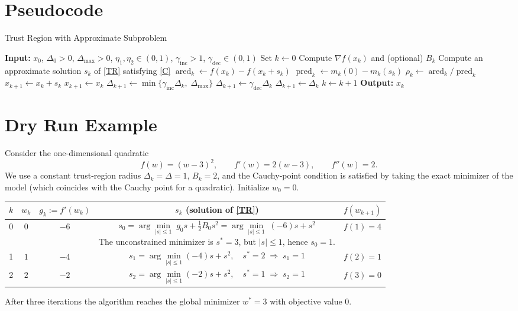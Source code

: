 \documentclass{article}
\begin{document}
\section*{Pseudocode}
\begin{algorithm}[H]
\caption{Trust Region with Approximate Subproblem}
\begin{algorithmic}[1]
\State \textbf{Input:} $x_0$, $\Delta_0>0$, $\Delta_{\max}>0$, $\eta_1,\eta_2\in(0,1)$,
$\gamma_{\text{inc}}>1$, $\gamma_{\text{dec}}\in(0,1)$
\State Set $k\gets0$
    \State Compute $\nabla f(x_k)$ and (optional) $B_k$
    \State Compute an approximate solution $s_k$ of \eqref{TR} satisfying \eqref{C}
    \State $\operatorname{ared}_k\gets f(x_k)-f(x_k+s_k)$
    \State $\operatorname{pred}_k\gets m_k(0)-m_k(s_k)$
    \State $\rho_k\gets \operatorname{ared}_k/\operatorname{pred}_k$ 
        \State $x_{k+1}\gets x_k+s_k$ 
    \Else
        \State $x_{k+1}\gets x_k$ 
    \EndIf
        \State $\Delta_{k+1}\gets \min\{\gamma_{\text{inc}}\Delta_k,\;\Delta_{\max}\}$
        \State $\Delta_{k+1}\gets \gamma_{\text{dec}}\Delta_k$
    \Else
        \State $\Delta_{k+1}\gets \Delta_k$
    \EndIf
    \State $k\gets k+1$
\EndWhile
\State \textbf{Output:} $x_k$
\end{algorithmic}
\end{algorithm}

\section*{Dry Run Example}
Consider the one‑dimensional quadratic
\[
f(w)=(w-3)^2,\qquad f'(w)=2(w-3),\qquad f''(w)=2.
\]
We use a constant trust‑region radius $\Delta_k=\Delta=1$, $B_k=2$, and the Cauchy‑point condition is satisfied by taking the exact minimizer of the model (which coincides with the Cauchy point for a quadratic).  
Initialize $w_0=0$.

\begin{center}
\begin{tabular}{c|c|c|c|c}
$k$ & $w_k$ & $g_k:=f'(w_k)$ & $s_k$ (solution of \eqref{TR}) & $f(w_{k+1})$\\\hline
0 & $0$ & $-6$ &
\begin{minipage}{0.25\linewidth}
\[
s_0=\arg\min_{|s|\le1}\; g_0 s+\tfrac12 B_0 s^2
= \arg\min_{|s|\le1}\; (-6)s+ s^2
\]
The unconstrained minimizer is $s^{*}=3$, but $|s|\le1$, hence $s_0=1$.
\end{minipage}
& $f(1)=4$\\\hline
1 & $1$ & $-4$ &
\[
s_1=\arg\min_{|s|\le1} (-4)s+s^2,\quad
s^{*}=2\;\Rightarrow\;s_1=1
\]
& $f(2)=1$\\\hline
2 & $2$ & $-2$ &
\[
s_2=\arg\min_{|s|\le1} (-2)s+s^2,\quad
s^{*}=1\;\Rightarrow\;s_2=1
\]
& $f(3)=0$\\\hline
\end{tabular}
\end{center}
After three iterations the algorithm reaches the global minimizer $w^{*}=3$ with objective value $0$.
\end{document}
